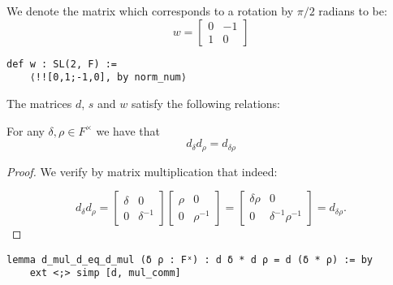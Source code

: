 \begin{definition}
\label{SpecialMatrices.w}
\leanok
 We denote the matrix which corresponds to a rotation by $\pi / 2$ radians to be:
 \[
 w = \begin{bmatrix}
    0 & -1\\
    1 & 0
 \end{bmatrix}
 \]
\end{definition}
\begin{footnotesize}
\begin{verbatim}
def w : SL(2, F) :=
    ⟨!![0,1;-1,0], by norm_num⟩
\end{verbatim}
\end{footnotesize}

The matrices $d$, $s$ and $w$ satisfy the following relations:


\begin{lemma}
\label{SpecialMatrices.d_mul_d_eq_d_mul}
\leanok
For any $\delta, \rho \in F^\times$ we have that
\[
d_\delta d_\rho = d_{\delta\rho}
\]
\end{lemma}
\begin{proof}
\leanok
    We verify by matrix multiplication that indeed:

    \begin{equation*}
        d_\delta d_\rho = \begin{bmatrix} \delta & 0 \\ 0 & \delta^{-1} \end{bmatrix} \begin{bmatrix} \rho & 0 \\ 0 & \rho^{-1} \end{bmatrix} = 
        \begin{bmatrix} \delta \rho & 0 \\ 0 & \delta^{-1} \rho^{-1} \end{bmatrix} = d_{\delta \rho}.
    \end{equation*}
\end{proof}
\begin{footnotesize}
\begin{verbatim}
lemma d_mul_d_eq_d_mul (δ ρ : Fˣ) : d δ * d ρ = d (δ * ρ) := by
    ext <;> simp [d, mul_comm]
\end{verbatim}
\end{footnotesize}

